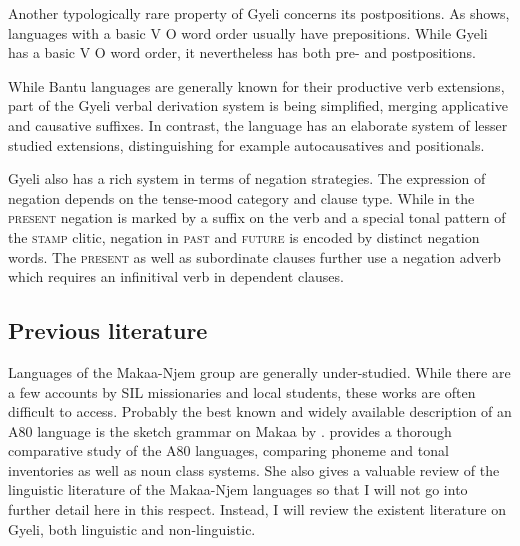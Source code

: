 Another typologically rare property of Gyeli concerns its postpositions. As \citet{dryer2013a} shows, languages with a basic V O word order usually have prepositions. While Gyeli has a basic V O word order, it  nevertheless has both pre- and postpositions.

While Bantu languages are generally known for their productive verb extensions, part of the Gyeli verbal derivation system is being simplified, merging applicative and causative suffixes. In contrast, the language has an elaborate system of lesser studied extensions, distinguishing for example autocausatives and positionals.

Gyeli also has a rich system in terms of negation strategies. The expression of negation depends on the tense-mood category and clause type. While in the \textsc{present} negation is marked by a suffix on the verb and a special tonal pattern of the \textsc{stamp} clitic, negation in \textsc{past} and \textsc{future} is encoded by distinct negation words. The \textsc{present} as well as subordinate clauses further use a negation adverb which requires an infinitival verb in dependent clauses.



\subsection{Previous literature}
\largerpage
Languages of the Makaa-Njem group are generally under-studied.
While there are a few accounts by SIL missionaries and local students, these works are often difficult to access. Probably the best known and widely available description of an A80 language is the sketch grammar on Makaa by \citet{heath2003}.  \citet{cheucle2014} provides a thorough comparative study of the A80 languages, comparing phoneme and tonal inventories as well as noun class systems. She also gives a valuable review of the linguistic literature of the Makaa-Njem languages so that I will not go into further detail here in this respect. Instead, I will review the existent literature on Gyeli, both linguistic and non-linguistic.

